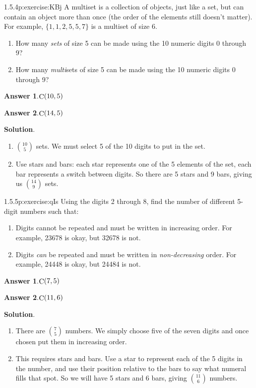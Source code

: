 \documentclass[twoside,11pt,]{book}
\newcommand{\blocktitlefont}{\relax}
\numberwithin{equation}{chapter}
\begin{document}
\begin{divisionsolution}{1.5.4}{}{p:exercise:KBj}%
A multiset is a collection of objects, just like a set, but can contain an object more than once (the order of the elements still doesn't matter). For example, \(\{1,1, 2, 5, 5, 7\}\) is a multiset of size 6.%
\begin{enumerate}[label=(\alph*)]
\item{}How many \emph{sets} of size 5 can be made using the 10 numeric digits 0 through 9?%
\item{}How many \emph{multi}sets of size 5 can be made using the 10 numeric digits 0 through 9?%
\end{enumerate}
%
\par\smallskip%
\noindent\textbf{\blocktitlefont Answer 1}.\quad{}\(\mathop{\rm C}\nolimits\!\left(10,5\right)\)%
\par\smallskip%
\noindent\textbf{\blocktitlefont Answer 2}.\quad{}\(\mathop{\rm C}\nolimits\!\left(14,5\right)\)%
\par\smallskip%
\noindent\textbf{\blocktitlefont Solution}.\quad{}%
\begin{enumerate}[label=(\alph*)]
\item{}\({10\choose 5}\) sets. We must select 5 of the 10 digits to put in the set.%
\item{}Use stars and bars: each star represents one of the 5 elements of the set, each bar represents a switch between digits. So there are 5 stars and 9 bars, giving us \({14 \choose 9}\) sets.%
\end{enumerate}
%
\end{divisionsolution}%
\begin{divisionsolution}{1.5.5}{}{p:exercise:qIs}%
Using the digits 2 through 8, find the number of different 5-digit numbers such that:%
\begin{enumerate}[label=(\alph*)]
\item{}Digits cannot be repeated and must be written in increasing order. For example, 23678 is okay, but 32678 is not.%
\item{}Digits \emph{can} be repeated and must be written in \emph{non-decreasing} order. For example, 24448 is okay, but 24484 is not.%
\end{enumerate}
%
\par\smallskip%
\noindent\textbf{\blocktitlefont Answer 1}.\quad{}\(\mathop{\rm C}\nolimits\!\left(7,5\right)\)%
\par\smallskip%
\noindent\textbf{\blocktitlefont Answer 2}.\quad{}\(\mathop{\rm C}\nolimits\!\left(11,6\right)\)%
\par\smallskip%
\noindent\textbf{\blocktitlefont Solution}.\quad{}%
\begin{enumerate}[label=(\alph*)]
\item{}There are \({7 \choose 5}\) numbers. We simply choose five of the seven digits and once chosen put them in increasing order.%
\item{}This requires stars and bars. Use a star to represent each of the 5 digits in the number, and use their position relative to the bars to say what numeral fills that spot. So we will have 5 stars and 6 bars, giving \({11 \choose 6}\) numbers.%
\end{enumerate}
%
\end{divisionsolution}%
\end{document}
